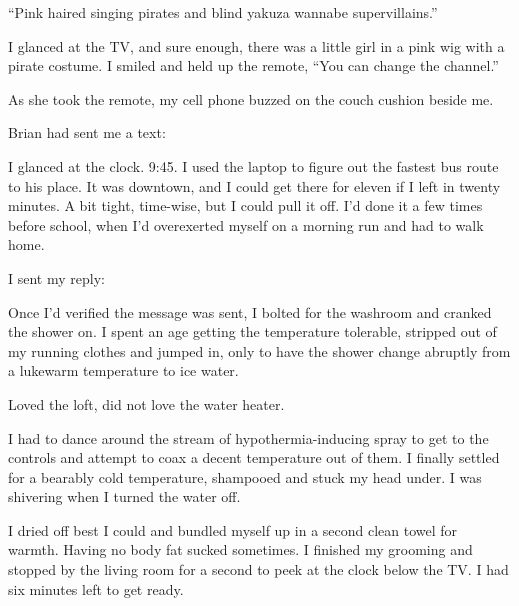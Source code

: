 ``Pink haired singing pirates and blind yakuza wannabe supervillains.''



I glanced at the TV, and sure enough, there was a little girl in a pink wig with a pirate costume.  I smiled and held up the remote, ``You can change the channel.''



As she took the remote, my cell phone buzzed on the couch cushion beside me.



Brian had sent me a text:




I glanced at the clock.  9:45.  I used the laptop to figure out the fastest bus route to his place.  It was downtown, and I could get there for eleven if I left in twenty minutes.  A bit tight, time-wise, but I could pull it off.  I'd done it a few times before school, when I'd overexerted myself on a morning run and had to walk home.



I sent my reply:




Once I'd verified the message was sent, I bolted for the washroom and cranked the shower on.  I spent an age getting the temperature tolerable, stripped out of my running clothes and jumped in, only to have the shower change abruptly from a lukewarm temperature to ice water.



Loved the loft, did not love the water heater.



I had to dance around the stream of hypothermia-inducing spray to get to the controls and attempt to coax a decent temperature out of them.  I finally settled for a bearably cold temperature, shampooed and stuck my head under.  I was shivering when I turned the water off.



I dried off best I could and bundled myself up in a second clean towel for warmth.  Having no body fat sucked sometimes.  I finished my grooming and stopped by the living room for a second to peek at the clock below the TV.  I had six minutes left to get ready.



